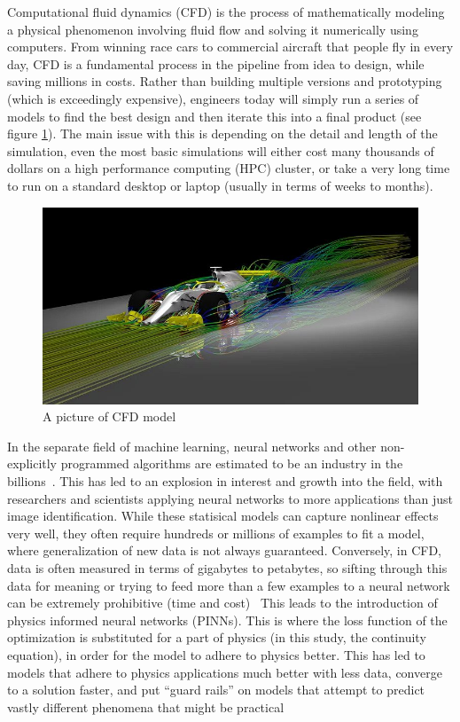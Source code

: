 \documentclass{article}
\begin{document}
\indent Computational fluid dynamics (CFD) is the process of
mathematically modeling a physical phenomenon involving fluid flow and solving
it numerically using computers\cite{SimScale}. From winning race cars to
commercial aircraft that people fly in every day, CFD is a fundamental process
in the pipeline from idea to design, while saving millions in costs. Rather
than building multiple versions and prototyping (which is exceedingly
expensive), engineers today will simply run a series of models to find the best
design and then iterate this into a final product (see figure
\ref{fig:CFD_Image}). The main issue with this is depending on the detail and
length of the simulation, even the most basic simulations will either cost many
thousands of dollars on a high performance computing (HPC) cluster, or take a
very long time to run on a standard desktop or laptop (usually in terms of
weeks to months).

\begin{figure}[h]
	\centering
	\includegraphics[scale=0.4]{./images/cfd.jpg}
	\caption{A picture of CFD model \cite{ANSYS.com}}
	\label{fig:CFD_Image}
\end{figure}

In the separate field of machine learning, neural networks and other
non-explicitly programmed algorithms are estimated to be an industry in the
billions~\cite{nn_history}. This has led to an explosion in interest and growth
into the field, with researchers and scientists applying neural networks to
more applications than just image identification. While these statisical models
can capture nonlinear effects very well, they often require hundreds or
millions of examples to fit a model, where generalization of new data is not
always guaranteed. Conversely, in CFD, data is often measured in terms of
gigabytes to petabytes, so sifting through this data for meaning or trying to
feed more than a few examples to a neural network can be extremely prohibitive
(time and cost)~\cite{DBLP:journals/corr/abs-1711-10566} This leads to the
introduction of physics informed neural networks (PINNs)\cite{PINN_History}.
This is where the loss function of the optimization is substituted for a part
of physics (in this study, the continuity equation), in order for the model to
adhere to physics better. This has led to models that adhere to physics
applications much better with less data, converge to a solution faster, and put
``guard rails'' on models that attempt to predict vastly different phenomena
that
might be practical~\cite{DBLP:journals/corr/abs-1711-10561, raissi2018deepVIV}
\end{document}
